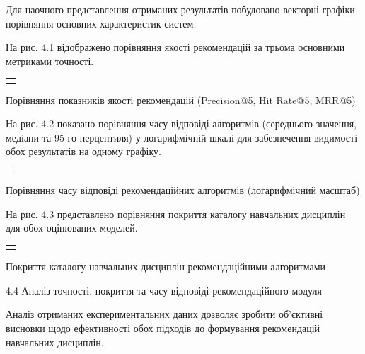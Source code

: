 \documentclass[
]{article}
\newcounter{none} %
\begin{document}
Для наочного представлення отриманих результатів побудовано векторні
графіки порівняння основних характеристик систем.

На рис. 4.1 відображено порівняння якості рекомендацій за трьома
основними метриками точності.

{\def\LTcaptype{none} %
\begin{longtable}[]{@{}
  >{\raggedright\arraybackslash}p{}@{}}
\toprule\noalign{}
\endhead
\bottomrule\noalign{}
\endlastfoot
 \\
\end{longtable}
}

Порівняння показників якості рекомендацій (Precision@5, Hit Rate@5,
MRR@5)

На рис. 4.2 показано порівняння часу відповіді алгоритмів (середнього
значення, медіани та 95-го перцентиля) у логарифмічній шкалі для
забезпечення видимості обох результатів на одному графіку.

{\def\LTcaptype{none} %
\begin{longtable}[]{@{}
  >{\raggedright\arraybackslash}p{}@{}}
\toprule\noalign{}
\endhead
\bottomrule\noalign{}
\endlastfoot
 \\
\end{longtable}
}

Порівняння часу відповіді рекомендаційних алгоритмів (логарифмічний
масштаб)

На рис. 4.3 представлено порівняння покриття каталогу навчальних
дисциплін для обох оцінюваних моделей.

{\def\LTcaptype{none} %
\begin{longtable}[]{@{}
  >{\raggedright\arraybackslash}p{}@{}}
\toprule\noalign{}
\endhead
\bottomrule\noalign{}
\endlastfoot
 \\
\end{longtable}
}

Покриття каталогу навчальних дисциплін рекомендаційними алгоритмами

\protect{}\label{ux430ux43dux430ux43bux456ux437-ux440ux435ux437ux443ux43bux44cux442ux430ux442ux456ux432}{}4.4
Аналіз точності, покриття та часу відповіді рекомендаційного модуля

Аналіз отриманих експериментальних даних дозволяє зробити об'єктивні
висновки щодо ефективності обох підходів до формування рекомендацій
навчальних дисциплін.
\end{document}
